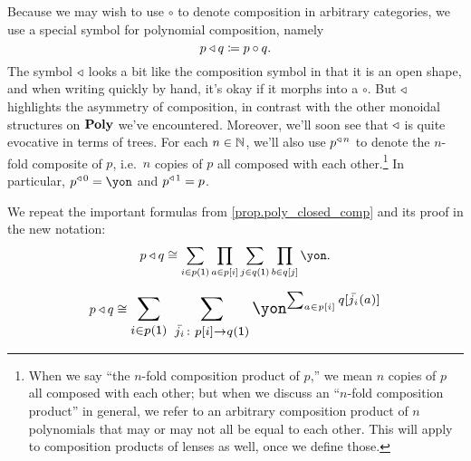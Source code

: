 \documentclass[Book-Poly]{subfiles}
\begin{document}
Because we may wish to use $\circ$ to denote composition in arbitrary categories, we use a special symbol for polynomial composition, namely
\[
p\mathbin{\triangleleft} q\coloneqq p\circ q.
\]
The symbol $\mathbin{\triangleleft}$ looks a bit like the composition symbol in that it is an open shape, and when writing quickly by hand, it's okay if it morphs into a $\circ$.
But $\mathbin{\triangleleft}$ highlights the asymmetry of composition, in contrast with the other monoidal structures on $\mathbf{Poly}$ we've encountered.
Moreover, we'll soon see that $\mathbin{\triangleleft}$ is quite evocative in terms of trees.
For each $n\in\mathbb{N}$, we'll also use $p^{\mathbin{\triangleleft}\,n}$ to denote the $n$-fold composite of $p$, i.e.\ $n$ copies of $p$ all composed with each other.\footnote{When we say ``the $n$-fold composition product of $p$,'' we mean $n$ copies of $p$ all composed with each other; but when we discuss an ``$n$-fold composition product'' in general, we refer to an arbitrary composition product of $n$ polynomials that may or may not all be equal to each other. This will apply to composition products of lenses as well, once we define those.}
In particular, $p\tripow0=\yon$ and $p^{\mathbin{\triangleleft}\,1}=p$.

We repeat the important formulas from \cref{prop.poly_closed_comp} and its proof in the new notation:
\begin{equation}\label{eqn.composite_formula}
p\tri q\iso\sum_{i\in p(\1)}\prod_{a\in p[i]}\sum_{j\in q(\1)}\prod_{b\in q[j]}\yon.
\end{equation}

\begin{align}\label{eqn.composite_formula_sums_first}
  p\tri q\iso
  \scalebox{1.3}{$\displaystyle
  \sum_{i\in p(\1)} \; \sum_{\bar{j_i}\colon p[i]\to q(\1)}\yon^{\sum_{a\in p[i]}q[\bar{j_i}(a)]}$}
\end{align}

\end{document}
